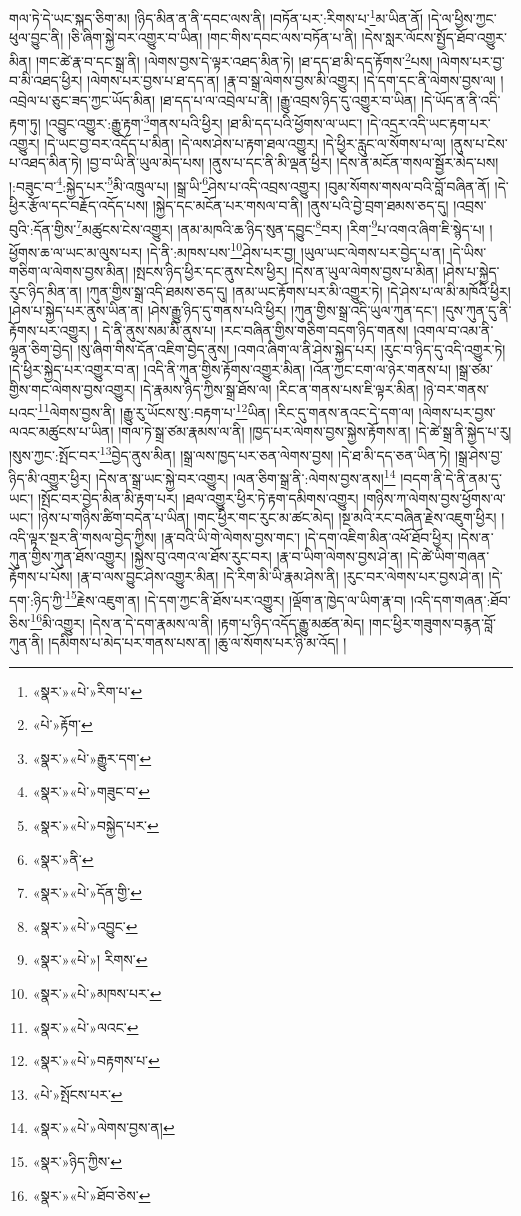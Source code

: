 གལ་ཏེ་དེ་ཡང་སྐད་ཅིག་མ། །ཉིད་མིན་ན་ནི་དབང་ལས་ནི། །བཏོན་པར་:རིགས་པ་\footnote{«སྣར་»«པེ་»རིག་པ་}མ་ཡིན་ནོ། །དེ་ལ་ཕྱིས་ཀྱང་ཕུལ་བྱུང་ནི། །ཅི་ཞིག་སྐྱེ་བར་འགྱུར་བ་ཡིན། །གང་གིས་དབང་ལས་བཏོན་པ་ནི། །དེས་སླར་ལོངས་སྤྱོད་ཐོབ་འགྱུར་མིན། །གང་ཚེ་རྣ་བ་དང་སྒྲ་ནི། །ལེགས་བྱས་དེ་ལྟར་འཐད་མིན་ཏེ། །ཐ་དད་ཐ་མི་དད་རྟོགས་\footnote{«པེ་»རྟོག་}པས། །ལེགས་པར་བྱ་བ་མི་འཐད་ཕྱིར། །ལེགས་པར་བྱས་པ་ཐ་དད་ན། །རྣ་བ་སྒྲ་ལེགས་བྱས་མི་འགྱུར། །དེ་དག་དང་ནི་ལེགས་བྱས་ལ། །འབྲེལ་པ་ཅུང་ཟད་ཀྱང་ཡོད་མིན། །ཐ་དད་པ་ལ་འབྲེལ་པ་ནི། །རྒྱུ་འབྲས་ཉིད་དུ་འགྱུར་བ་ཡིན། །དེ་ཡོད་ན་ནི་འདི་རྟག་ཏུ། །འབྱུང་འགྱུར་:རྒྱུ་རྟག་\footnote{«སྣར་»«པེ་»རྒྱུར་དག་}གནས་པའི་ཕྱིར། །ཐ་མི་དད་པའི་ཕྱོགས་ལ་ཡང་། །དེ་འདྲར་འདི་ཡང་རྟག་པར་འགྱུར། །དེ་ཡང་བྱ་བར་འདོད་པ་མིན། །དེ་ལས་ཤེས་པ་རྟག་ཐལ་འགྱུར། །དེ་ཕྱིར་རླུང་ལ་སོགས་པ་ལ། །ནུས་པ་ངེས་པ་འཐད་མིན་ཏེ། །བྱ་བ་ཡི་ནི་ཡུལ་མེད་པས། །ནུས་པ་དང་ནི་མི་ལྡན་ཕྱིར། །དེས་ན་མངོན་གསལ་སྦྱོར་མེད་པས། །:བཟུང་བ་\footnote{«སྣར་»«པེ་»གཟུང་བ་}:སྐྱེད་པར་\footnote{«སྣར་»«པེ་»བསྐྱེད་པར་}མི་འཁྲུལ་པ། །སྒྲ་ཡི་\footnote{«སྣར་»ནི་}ཤེས་པ་འདི་འབྲས་འགྱུར། །བུམ་སོགས་གསལ་བའི་བློ་བཞིན་ནོ། །དེ་ཕྱིར་རྩོལ་དང་བརྗོད་འདོད་པས། །སྐྱེད་དང་མངོན་པར་གསལ་བ་ནི། །ནུས་པའི་བྱེ་བྲག་ཐམས་ཅད་དུ། །འབྲས་བུའི་:དོན་གྱིས་\footnote{«སྣར་»«པེ་»དོན་གྱི་}མཚུངས་ངེས་འགྱུར། །ནམ་མཁའི་ཆ་ཉིད་སུན་དབྱུང་\footnote{«སྣར་»«པེ་»འབྱུང་}བར། །རིག་\footnote{«སྣར་»«པེ་»། རིགས་}པ་འགའ་ཞིག་ཇི་སྙེད་པ། །ཕྱོགས་ཆ་ལ་ཡང་མ་ལུས་པར། །དེ་ནི་:མཁས་པས་\footnote{«སྣར་»«པེ་»མཁས་པར་}ཤེས་པར་བྱ། །ཡུལ་ཡང་ལེགས་པར་བྱེད་པ་ན། །དེ་ཡིས་གཅིག་ལ་ལེགས་བྱས་མིན། །སྤངས་ཉིད་ཕྱིར་དང་ནུས་ངེས་ཕྱིར། །དེས་ན་ཡུལ་ལེགས་བྱས་པ་མིན། །ཤེས་པ་སྐྱེད་རུང་ཉིད་མིན་ན། །ཀུན་གྱིས་སྒྲ་འདི་ཐམས་ཅད་དུ། །ནམ་ཡང་རྟོགས་པར་མི་འགྱུར་ཏེ། །དེ་ཤེས་པ་ལ་མི་མཁོའི་ཕྱིར། །ཤེས་པ་སྐྱེད་པར་ནུས་ཡིན་ན། །ཤེས་རྒྱུ་ཉིད་དུ་གནས་པའི་ཕྱིར། །ཀུན་གྱིས་སྒྲ་འདི་ཡུལ་ཀུན་དང་། །དུས་ཀུན་དུ་ནི་རྟོགས་པར་འགྱུར། །
དེ་ནི་ནུས་སམ་མི་ནུས་པ། །རང་བཞིན་གྱིས་གཅིག་བདག་ཉིད་གནས། །འགལ་བ་འམ་ནི་ལྷན་ཅིག་བྱེད། །སུ་ཞིག་གིས་དོན་འཇིག་བྱེད་ནུས། །འགའ་ཞིག་ལ་ནི་ཤེས་སྐྱེད་པར། །རུང་བ་ཉིད་དུ་འདི་འགྱུར་ཏེ། །དེ་ཕྱིར་སྐྱེད་པར་འགྱུར་བ་ན། །འདི་ནི་ཀུན་གྱིས་རྟོགས་འགྱུར་མིན། །འོན་ཀྱང་ངག་ལ་ཉེར་གནས་པ། །སྒྲ་ཙམ་གྱིས་གང་ལེགས་བྱས་འགྱུར། །དེ་རྣམས་ཉིད་ཀྱིས་སྒྲ་ཐོས་ལ། །རིང་ན་གནས་པས་ཇི་ལྟར་མིན། །ཉེ་བར་གནས་པའང་\footnote{«སྣར་»«པེ་»ལའང་}ལེགས་བྱས་ནི། །རྒྱུ་རུ་ཡོངས་སུ་:བརྟག་པ་\footnote{«སྣར་»«པེ་»བརྟགས་པ་}ཡིན། །རིང་དུ་གནས་ནའང་དེ་དག་ལ། །ལེགས་པར་བྱས་ལའང་མཚུངས་པ་ཡིན། །གལ་ཏེ་སྒྲ་ཙམ་རྣམས་ལ་ནི། །ཁྱད་པར་ལེགས་བྱས་སྐྱེས་རྟོགས་ན། །དེ་ཚེ་སྒྲ་ནི་སྐྱེད་པ་རུ། །སུས་ཀྱང་:སྤོང་བར་\footnote{«པེ་»སྤོངས་པར་}བྱེད་ནུས་མིན། །སྒྲ་ལས་ཁྱད་པར་ཅན་ལེགས་བྱས། །དེ་ཐ་མི་དད་ཅན་ཡིན་ཏེ། །སྒྲ་ཤེས་བྱ་ཉིད་མི་འགྱུར་ཕྱིར། །དེས་ན་སྒྲ་ཡང་སྐྱེ་བར་འགྱུར། །ལན་ཅིག་སྒྲ་ནི་:ལེགས་བྱས་ནས།\footnote{«སྣར་»«པེ་»ལེགས་བྱས་ན།} །བདག་ནི་དེ་ནི་ནམ་དུ་ཡང་། །སྤོང་བར་བྱེད་མིན་མི་རྟག་པར། །ཐལ་འགྱུར་ཕྱིར་ཏེ་རྟག་དམིགས་འགྱུར། །གཉིས་ཀ་ལེགས་བྱས་ཕྱོགས་ལ་ཡང་། །ཉེས་པ་གཉིས་ཚིག་བདེན་པ་ཡིན། །གང་ཕྱིར་གང་རུང་མ་ཚང་མེད། །སྔ་མའི་རང་བཞིན་རྗེས་འཇུག་ཕྱིར། །འདི་ལྟར་སྔར་ནི་གསལ་བྱེད་ཀྱིས། །རྣ་བའི་ཡི་གེ་ལེགས་བྱས་གང་། །དེ་དག་འཇིག་མིན་འཕོ་ཐོབ་ཕྱིར། །དེས་ན་ཀུན་གྱིས་ཀུན་ཐོས་འགྱུར། །སྐྱེས་བུ་འགའ་ལ་ཐོས་རུང་བར། །རྣ་བ་ཡིག་ལེགས་བྱས་ཤེ་ན། །དེ་ཚེ་ཡིག་གཞན་རྟོགས་པ་པོས། །རྣ་བ་ལས་བྱུང་ཤེས་འགྱུར་མིན། །དེ་རིག་མི་ཡི་རྣམ་ཤེས་ནི། །རུང་བར་ལེགས་པར་བྱས་ཤེ་ན། །དེ་དག་:ཉིད་ཀྱི་\footnote{«སྣར་»ཉིད་ཀྱིས་}རྗེས་འཇུག་ན། །དེ་དག་ཀྱང་ནི་ཐོས་པར་འགྱུར། །ལྡོག་ན་ཁྱེད་ལ་ཡིག་རྣ་བ། །འདི་དག་གཞན་:ཐོབ་ཅིས་\footnote{«སྣར་»«པེ་»ཐོབ་ཅེས་}མི་འགྱུར། །དེས་ན་དེ་དག་རྣམས་ལ་ནི། །རྟག་པ་ཉིད་འདོད་རྒྱུ་མཚན་མེད། །གང་ཕྱིར་གཟུགས་བརྙན་བློ་ཀུན་ནི། །དམིགས་པ་མེད་པར་གནས་པས་ན། །ཆུ་ལ་སོགས་པར་ཉི་མ་འོད། །
